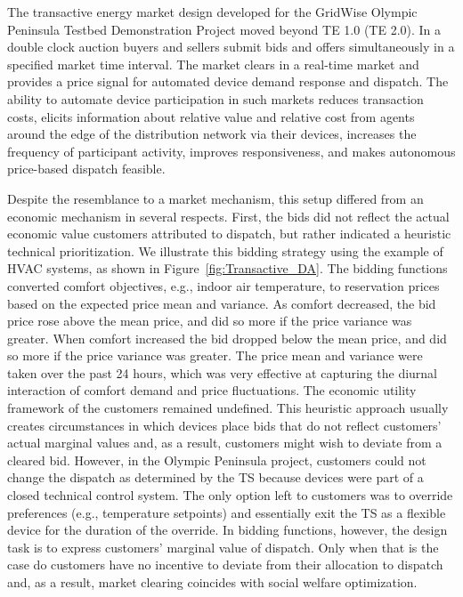 The transactive energy market design developed for the GridWise Olympic Peninsula Testbed Demonstration Project \citep{hammerstrom_2008} moved beyond TE 1.0 (TE 2.0). In a double clock auction buyers and sellers submit bids and offers simultaneously in a specified market time interval. 
The market clears in a real-time market and provides a price signal for automated device demand response and dispatch.
The ability to automate device participation in such markets reduces transaction costs, elicits information about relative value and relative cost from agents around the edge of the distribution network via their devices, increases the frequency of participant activity, improves responsiveness, and makes autonomous price-based dispatch feasible. 

Despite the resemblance to a market mechanism, this setup differed from an economic mechanism in several respects. First, the bids did not reflect the actual economic value customers attributed to dispatch, but rather indicated a heuristic technical prioritization. 
We illustrate this bidding strategy using the example of HVAC systems, as shown in  Figure~\ref{fig:Transactive_DA}.
The bidding functions converted comfort objectives, e.g., indoor air temperature, to reservation prices based on the expected price mean and variance. As comfort decreased, the bid price rose above the mean price, and did so more if the price variance was greater. When comfort increased the bid dropped below the mean price, and did so more if the price variance was greater. The price mean and variance were taken over the past 24 hours, which was very effective at capturing the diurnal interaction of comfort demand and price fluctuations.
The economic utility framework of the customers remained undefined. This heuristic approach usually creates circumstances in which devices place bids that do not reflect customers' actual marginal values and, as a result, customers might wish to deviate from a cleared bid. However, in the Olympic Peninsula project, customers could not change the dispatch as determined by the TS because devices were part of a closed technical control system. The only option left to customers was to override preferences (e.g., temperature setpoints) and essentially exit the TS as a flexible device for the duration of the override. In bidding functions, however, the design task is to express customers' marginal value of dispatch. Only when that is the case do customers have no incentive to deviate from their allocation to dispatch and, as a result, market clearing coincides with social welfare optimization. 

